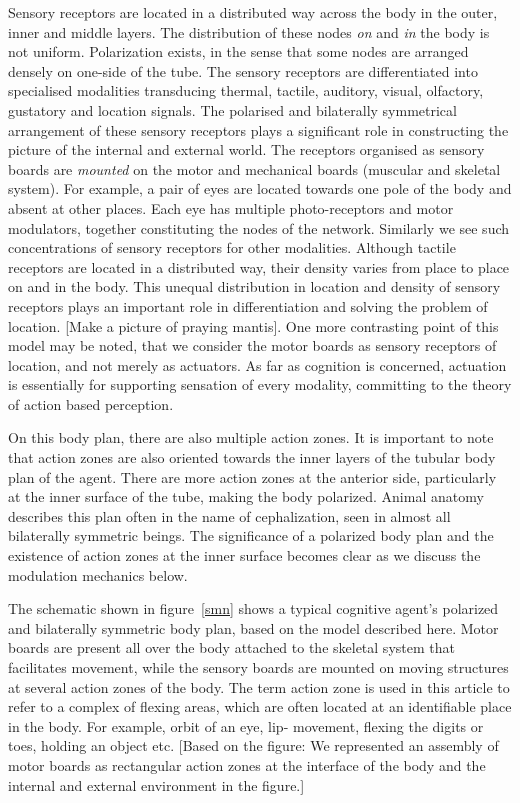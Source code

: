Sensory receptors are located in a distributed way across the body in the outer, inner and middle layers. The distribution of these nodes \textit{on} and \textit{in} the body is not uniform. Polarization exists, in the sense that some nodes are arranged densely on one-side of the tube. The sensory receptors are differentiated into specialised modalities transducing thermal, tactile, auditory, visual, olfactory, gustatory and location signals. The polarised and bilaterally symmetrical arrangement of these sensory receptors plays a significant role in constructing the picture of the internal and external world. The receptors organised as sensory boards are \textit{mounted} on the motor and mechanical boards (muscular and skeletal system). For example, a pair of eyes are located towards one pole of the body and absent at other places. Each eye has multiple photo-receptors and motor modulators, together constituting the nodes of the network. Similarly we see such concentrations of sensory receptors for other modalities. Although tactile receptors are located in a distributed way, their density varies from place to place on and in the body. This unequal distribution in location and density of sensory receptors plays an important role in differentiation and solving the problem of location. [Make a picture of praying mantis]. One more contrasting point of this model may be noted, that we consider the motor boards as sensory receptors of location, and not merely as actuators. As far as cognition is concerned, actuation is essentially for supporting sensation of every modality, committing to the theory of action based perception.

On this body plan, there are also multiple action zones. It is important to note that action zones are also oriented towards the inner layers of the tubular body plan of the agent. There are more action zones at the anterior side, particularly at the inner surface of the tube, making the body polarized. Animal anatomy describes this plan often in the name of cephalization, seen in almost all bilaterally symmetric beings. The significance of a polarized body plan and the existence of action zones at the inner surface becomes clear as we discuss the modulation mechanics below.

The schematic shown in figure~\ref{smn} shows a typical cognitive agent's polarized and bilaterally symmetric body plan, based on the model described here. Motor boards are present all over the body attached to the skeletal system that facilitates movement, while the sensory boards are mounted on moving structures at several action zones of the body. The term action zone is used in this article to refer to a complex of flexing areas, which are often located at an identifiable place in the body. For example, orbit of an eye, lip- movement, flexing the digits or toes, holding an object etc. [Based on the figure: We represented an assembly of motor boards as rectangular action zones at the interface of the body and the internal and external environment in the figure.]

